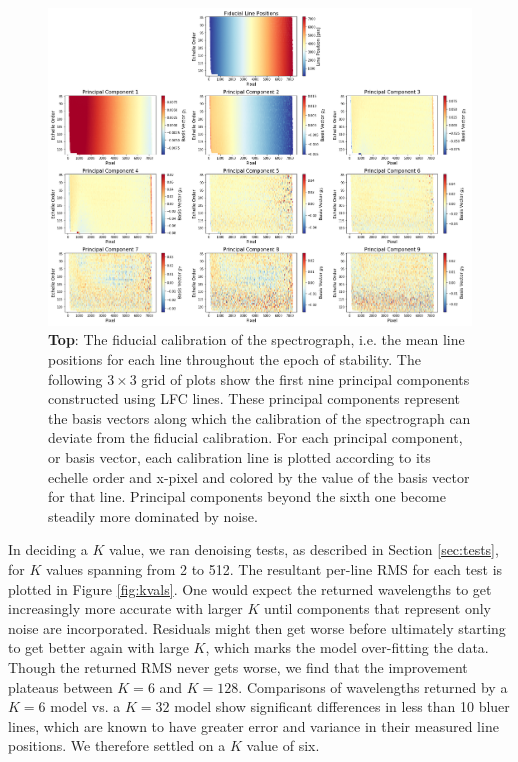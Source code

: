 \documentclass[modern]{aastex63}
\begin{document}
\begin{figure}[t]
\centering
\includegraphics[width=\textwidth]{Figures/pcsLfc9.png}
\caption{\textbf{Top}:  The fiducial calibration of the spectrograph, i.e. the mean line positions for each line throughout the epoch of stability.  The following $3 \times 3$ grid of plots show the first nine principal components constructed using LFC lines.  These principal components represent the basis vectors along which the calibration of the spectrograph can deviate from the fiducial calibration.  For each principal component, or basis vector, each calibration line is plotted according to its echelle order and x-pixel and colored by the value of the basis vector for that line.  Principal components beyond the sixth one become steadily more dominated by noise.}
\label{fig:pcLfc}
\end{figure}

In deciding a $K$ value, we ran denoising tests, as described in Section \ref{sec:tests}, for $K$ values spanning from 2 to 512.  The resultant per-line RMS for each test is plotted in Figure \ref{fig:kvals}.  One would expect the returned wavelengths to get increasingly more accurate with larger $K$ until components that represent only noise are incorporated.  Residuals might then get worse before ultimately starting to get better again with large $K$, which marks the model over-fitting the data.  Though the returned RMS never gets worse, we find that the improvement plateaus between $K=6$ and $K=128$.  Comparisons of wavelengths returned by a $K=6$ model vs. a $K=32$ model show significant differences in less than 10 bluer lines, which are known to have greater error and variance in their measured line positions.  We therefore settled on a $K$ value of six.
\end{document}

